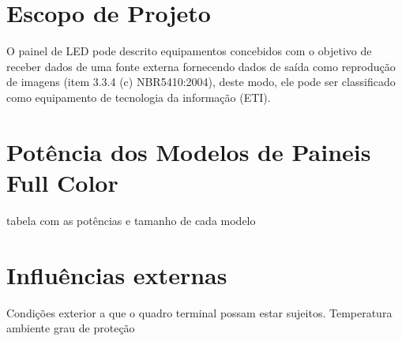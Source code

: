 \section{Escopo de Projeto}

O painel de LED pode descrito equipamentos concebidos com o objetivo de receber dados de uma fonte externa fornecendo dados de saída como reprodução de imagens (item 3.3.4 (c) NBR5410:2004), deste modo, ele pode ser classificado como equipamento de tecnologia da informação (ETI).
\section{Potência dos Modelos de Paineis Full Color}
tabela com as potências e tamanho de cada modelo

\section{Influências externas}

Condições exterior a que o quadro terminal possam estar sujeitos.
Temperatura ambiente
grau de proteção
